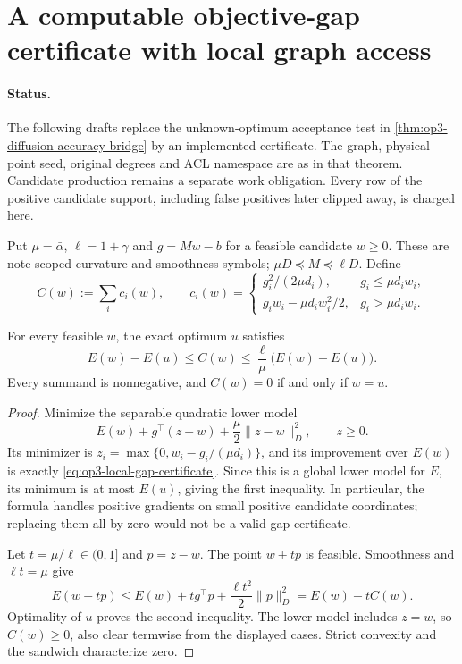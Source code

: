 \section[Computable local gap certificate]{A computable objective-gap certificate with local graph access}
\label{sec:op3-local-gap-certificate}

\paragraph{Status.}
The following \statusproved{} drafts replace the unknown-optimum acceptance
test in \cref{thm:op3-diffusion-accuracy-bridge} by an implemented certificate.
The graph, physical point seed, original degrees and ACL namespace are as
in that theorem. Candidate production remains a separate \statusopen{}
work obligation. Every row of the positive candidate support, including
false positives later clipped away, is charged here.

Put $\mu=\bar\alpha$, $\ell=1+\gamma$ and $g=Mw-b$ for a feasible
candidate $w\geq0$. These are note-scoped curvature and smoothness symbols;
$\mu D\preceq M\preceq\ell D$. Define
\begin{equation}
 C(w):=\sum_i c_i(w),\qquad
 c_i(w)=
 \begin{cases}
  g_i^2/(2\mu d_i),&g_i\leq\mu d_iw_i,\\
  g_iw_i-\mu d_iw_i^2/2,&g_i>\mu d_iw_i.
 \end{cases}
 \label{eq:op3-local-gap-certificate}
\end{equation}

\begin{lemma}
\label{lem:op3-local-gap-sandwich}
For every feasible $w$, the exact optimum $u$ satisfies
\begin{equation}
 E(w)-E(u)\leq C(w)\leq\frac{\ell}{\mu}\bigl(E(w)-E(u)\bigr).
 \label{eq:op3-gap-sandwich}
\end{equation}
Every summand is nonnegative, and $C(w)=0$ if and only if $w=u$.
\end{lemma}
\begin{proof}
Minimize the separable quadratic lower model
\[
 E(w)+g^\top(z-w)+\frac\mu2\|z-w\|_D^2,\qquad z\geq0.
\]
Its minimizer is $z_i=\max\{0,w_i-g_i/(\mu d_i)\}$, and its improvement
over $E(w)$ is exactly \cref{eq:op3-local-gap-certificate}. Since this is
a global lower model for $E$, its minimum is at most $E(u)$, giving
the first inequality. In particular, the formula handles positive
gradients on small positive candidate coordinates; replacing them all
by zero would not be a valid gap certificate.

Let $t=\mu/\ell\in(0,1]$ and $p=z-w$. The point $w+tp$ is feasible.
Smoothness and $\ell t=\mu$ give
\[
 E(w+tp)\leq E(w)+t g^\top p+\frac{\ell t^2}{2}\|p\|_D^2
 =E(w)-tC(w).
\]
Optimality of $u$ proves the second inequality. The lower model includes
$z=w$, so $C(w)\geq0$, also clear termwise from the displayed cases.
Strict convexity and the sandwich characterize zero.
\end{proof}

